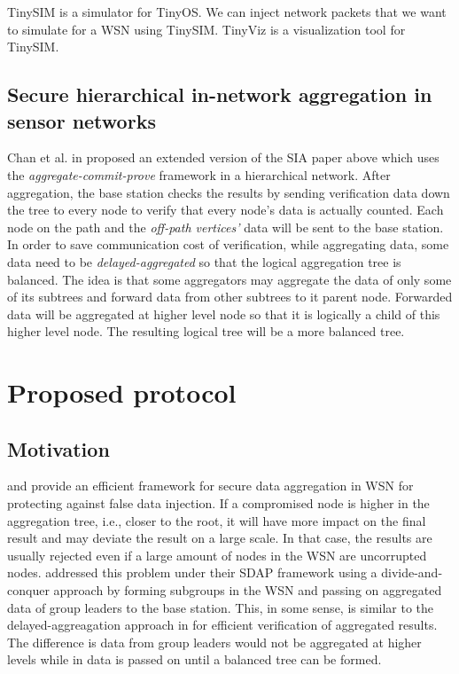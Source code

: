 \documentclass[a4paper]{article}
\begin{document}
TinySIM is a simulator for TinyOS. We can inject network packets that we want
to simulate for a WSN using TinySIM. TinyViz is a visualization tool for
TinySIM.

\subsection{Secure hierarchical in-network aggregation in sensor networks}

Chan et al. in \cite{Chan06} proposed an extended version of the SIA paper
above which uses the {\em aggregate-commit-prove} framework in a hierarchical
network. After aggregation, the base station checks the results by sending
verification data down the tree to every node to verify that every node's data
is actually counted. Each node on the path and the {\em off-path vertices'}
data will be sent to the base station.  In order to save communication cost of
verification, while aggregating data, some data need to be {\em
  delayed-aggregated} so that the logical aggregation tree is balanced.  The
idea is that some aggregators may aggregate the data of only some of its
subtrees and forward data from other subtrees to it parent node. Forwarded
data will be aggregated at higher level node so that it is logically a child
of this higher level node. The resulting logical tree will be a more balanced
tree.

\section{Proposed protocol}
\label{sec:protocol}

\subsection{Motivation}

\cite{SIA} and \cite{Chan06} provide an efficient framework for secure data
aggregation in WSN for protecting against false data injection. If a
compromised node is higher in the aggregation tree, i.e., closer to the root,
it will have more impact on the final result and may deviate the result on a
large scale.  In that case, the results are usually rejected even if a large
amount of nodes in the WSN are uncorrupted nodes. \cite{SDAP} addressed this
problem under their SDAP framework using a divide-and-conquer approach by
forming subgroups in the WSN and passing on aggregated data of group leaders
to the base station. This, in some sense, is similar to the
delayed-aggreagation approach in \cite{Chan06} for efficient verification of
aggregated results. The difference is data from group leaders would not be
aggregated at higher levels while in \cite{Chan06} data is passed on until a
balanced tree can be formed.
\end{document}
